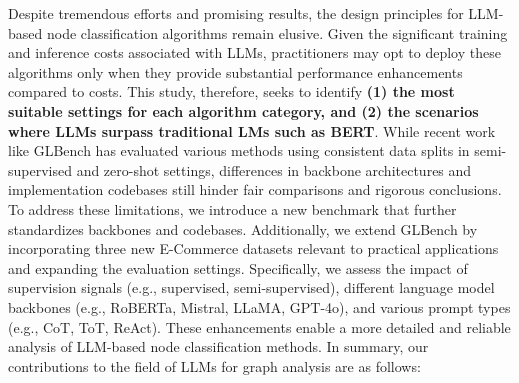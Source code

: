 Despite tremendous efforts and promising results, the design principles for LLM-based node classification algorithms remain elusive. Given the significant training and inference costs associated with LLMs, practitioners may opt to deploy these algorithms only when they provide substantial performance enhancements compared to costs. This study, therefore, seeks to identify \textbf{(1) the most suitable settings for each algorithm category, and (2) the scenarios where LLMs surpass traditional LMs such as BERT}. While recent work like GLBench \cite{Li2024GLBench} has evaluated various methods using consistent data splits in semi-supervised and zero-shot settings, differences in backbone architectures and implementation codebases still hinder fair comparisons and rigorous conclusions. To address these limitations, we introduce a new benchmark that further standardizes backbones and codebases. Additionally, we extend GLBench by incorporating three new E-Commerce datasets relevant to practical applications and expanding the evaluation settings. Specifically, we assess the impact of supervision signals (e.g., supervised, semi-supervised), different language model backbones (e.g., RoBERTa, Mistral, LLaMA, GPT-4o), and various prompt types (e.g., CoT, ToT, ReAct). These enhancements enable a more detailed and reliable analysis of LLM-based node classification methods. In summary, our contributions to the field of LLMs for graph analysis are as follows:





